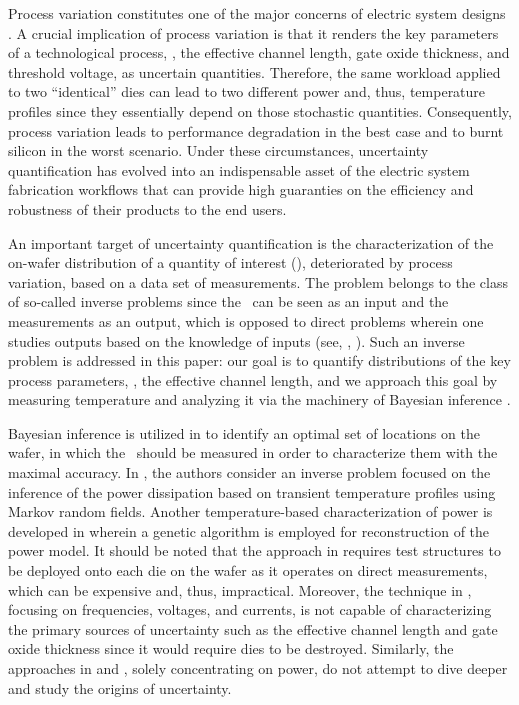 Process variation constitutes one of the major concerns of electric system designs \cite{chandrakasan2001, srivastava2010}. A crucial implication of process variation is that it renders the key parameters of a technological process, \eg, the effective channel length, gate oxide thickness, and threshold voltage, as uncertain quantities.
Therefore, the same workload applied to two ``identical'' dies can lead to two different power and, thus, temperature profiles since they essentially depend on those stochastic quantities. Consequently, process variation leads to performance degradation in the best case and to burnt silicon in the worst scenario.
Under these circumstances, uncertainty quantification has evolved into an indispensable asset of the electric system fabrication workflows that can provide high guaranties on the efficiency and robustness of their products to the end users.

An important target of uncertainty quantification is the characterization of the on-wafer distribution of a quantity of interest (\qoi), deteriorated by process variation, based on a data set of measurements.
The problem belongs to the class of so-called inverse problems since the \qoi\ can be seen as an input and the measurements as an output, which is opposed to direct problems wherein one studies outputs based on the knowledge of inputs (see, \eg, \cite{juan2011, juan2012}).
Such an inverse problem is addressed in this paper: our goal is to quantify distributions of the key process parameters, \eg, the effective channel length, and we approach this goal by measuring temperature and analyzing it via the machinery of Bayesian inference \cite{gelman2004}.

Bayesian inference is utilized in \cite{zhang2010} to identify an optimal set of locations on the wafer, in which the \qois\ should be measured in order to characterize them with the maximal accuracy.
In \cite{paek2012}, the authors consider an inverse problem focused on the inference of the power dissipation based on transient temperature profiles using Markov random fields.
Another temperature-based characterization of power is developed in \cite{mesa-martinez2007} wherein a genetic algorithm is employed for reconstruction of the power model.
It should be noted that the approach in \cite{zhang2010} requires test structures to be deployed onto each die on the wafer as it operates on direct measurements, which can be expensive and, thus, impractical. Moreover, the technique in \cite{zhang2010}, focusing on frequencies, voltages, and currents, is not capable of characterizing the primary sources of uncertainty such as the effective channel length and gate oxide thickness since it would require dies to be destroyed. Similarly, the approaches in \cite{paek2012} and \cite{mesa-martinez2007}, solely concentrating on power, do not attempt to dive deeper and study the origins of uncertainty.


